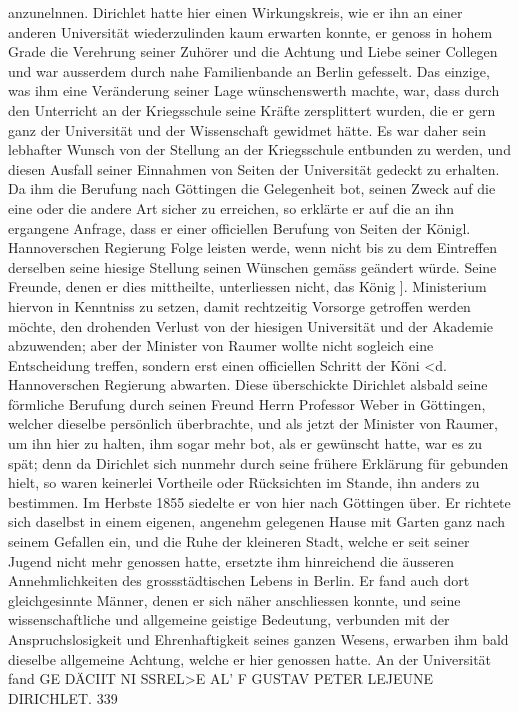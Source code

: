 \documentclass[11pt]{article}
\begin{document}
\noindent anzunelnnen. Dirichlet hatte hier einen Wirkungskreis, wie er ihn an einer anderen Universität wiederzulinden kaum erwarten konnte, er genoss in hohem Grade die Verehrung seiner Zuhörer und die Achtung und Liebe seiner Collegen und war ausserdem durch nahe Familienbande an Berlin gefesselt. Das einzige, was ihm eine Veränderung seiner Lage wünschenswerth machte, war, dass durch den Unterricht an der Kriegsschule seine Kräfte zersplittert wurden, die er gern ganz der Universität und der Wissenschaft gewidmet hätte. Es war daher sein lebhafter Wunsch von der Stellung an der Kriegsschule entbunden zu werden, und diesen Ausfall seiner Einnahmen von Seiten der Universität gedeckt zu erhalten. Da ihm die Berufung nach Göttingen die Gelegenheit bot, seinen Zweck auf die eine oder die andere Art sicher zu erreichen, so erklärte er auf die an ihn ergangene Anfrage, dass er einer officiellen Berufung von Seiten der Königl. Hannoverschen Regierung Folge leisten werde, wenn nicht bis zu dem Eintreffen derselben seine hiesige Stellung seinen Wünschen gemäss geändert würde. Seine Freunde, denen er dies mittheilte, unterliessen nicht, das König ]. Ministerium hiervon in Kenntniss zu setzen, damit rechtzeitig Vorsorge getroffen werden möchte, den drohenden Verlust von der hiesigen Universität und der Akademie abzuwenden; aber der Minister von Raumer wollte nicht sogleich eine Entscheidung treffen, sondern erst einen officiellen Schritt der Köni <d. Hannoverschen Regierung abwarten. Diese überschickte Dirichlet alsbald seine förmliche Berufung durch seinen Freund Herrn Professor Weber in Göttingen, welcher dieselbe persönlich überbrachte, und als jetzt der Minister von Raumer, um ihn hier zu halten, ihm sogar mehr bot, als er gewünscht hatte, war es zu spät; denn da Dirichlet sich nunmehr durch seine frühere Erklärung für gebunden hielt, so waren keinerlei Vortheile oder Rücksichten im Stande, ihn anders zu bestimmen. Im Herbste 1855 siedelte er von hier nach Göttingen über. Er richtete sich daselbst in einem eigenen, angenehm gelegenen Hause mit Garten ganz nach seinem Gefallen ein, und die Ruhe der kleineren Stadt, welche er seit seiner Jugend nicht mehr genossen hatte, ersetzte ihm hinreichend die äusseren Annehmlichkeiten des grossstädtischen Lebens in Berlin. Er fand auch dort gleichgesinnte Männer, denen er sich näher anschliessen konnte, und seine wissenschaftliche und allgemeine geistige Bedeutung, verbunden mit der Anspruchslosigkeit und Ehrenhaftigkeit seines ganzen Wesens, erwarben ihm bald dieselbe allgemeine Achtung, welche er hier genossen hatte. An der Universität fand GE DÄCIIT NI SSREL>E AL' F GUSTAV PETER LEJEUNE DIRICHLET. 339
\par
\end{document}
